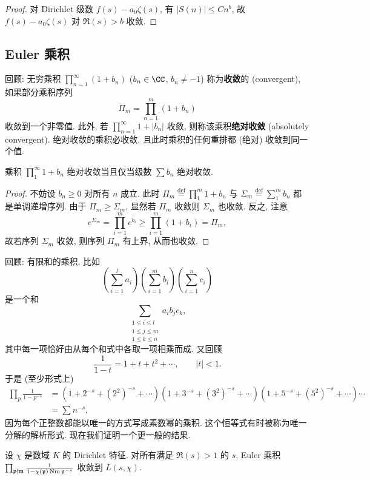 \begin{proof}
对 Dirichlet 级数 $f(s)-a_0\zeta(s)$, 有 $|S(n)|\le Cn^{b}$, 故 $f(s)-a_0\zeta(s)$ 对 $\Re(s)>b$ 收敛.
\end{proof}

\subsection*{Euler 乘积}

回顾: 无穷乘积 $\prod_{n=1}^{\infty}(1+b_n)$ ($b_n\in\CC$, $b_n\ne-1$) 称为\textbf{收敛}的 (convergent), 如果部分乘积序列
\[
\Pi_{m}=\prod_{n=1}^{m}(1+b_{n})
\]
收敛到一个非零值. 此外, 若 $\prod_{n=1}^{\infty}1+|b_{n}|$ 收敛, 则称该乘积\textbf{绝对收敛} (absolutely convergent). 绝对收敛的乘积必收敛, 且此时乘积的任何重排都 (绝对) 收敛到同一个值.

\begin{lemma}\label{lem:vi.2.6}
乘积 $\prod_{1}^{\infty}1+b_n$ 绝对收敛当且仅当级数 $\sum b_n$ 绝对收敛.
\end{lemma}

\begin{proof}
不妨设 $b_n\ge0$ 对所有 $n$ 成立. 此时 $\Pi_m\overset{\text{def}}{=}\prod_1^m 1+b_n$ 与 $\Sigma_m\overset{\text{def}}{=}\sum_1^m b_n$ 都是单调递增序列. 由于 $\Pi_m\ge\Sigma_m$, 显然若 $\Pi_m$ 收敛则 $\Sigma_m$ 也收敛. 反之, 注意
\[
e^{\Sigma_{m}}=\prod_{i=1}^{m}e^{b_{i}}\ge\prod_{i=1}^{m}(1+b_{i})=\Pi_{m},
\]
故若序列 $\Sigma_m$ 收敛, 则序列 $\Pi_m$ 有上界, 从而也收敛.
\end{proof}

回顾: 有限和的乘积, 比如
\[
\left(\sum_{i=1}^{l}a_{i}\right)\left(\sum_{i=1}^{m}b_{i}\right)\left(\sum_{i=1}^{n}c_{i}\right)
\]
是一个和
\[
\sum_{\substack{1\le i\le l\\1\le j\le m\\1\le k\le n}}a_{i}b_{j}c_{k},
\]
其中每一项恰好由从每个和式中各取一项相乘而成. 又回顾
\[
\frac{1}{1-t}=1+t+t^{2}+\cdots,\qquad|t|<1.
\]
于是 (至少形式上)
\begin{align*}
\prod_{p}\frac{1}{1-p^{-s}}&=(1+2^{-s}+(2^{2})^{-s}+\cdots)(1+3^{-s}+(3^{2})^{-s}+\cdots)(1+5^{-s}+(5^{2})^{-s}+\cdots)\cdots\\
&=\sum n^{-s},
\end{align*}
因为每个正整数都能以唯一的方式写成素数幂的乘积. 这个恒等式有时被称为唯一分解的解析形式. 现在我们证明一个更一般的结果.

\begin{proposition}\label{prop:vi.2.7}
设 $\chi$ 是数域 $K$ 的 Dirichlet 特征. 对所有满足 $\Re(s)>1$ 的 $s$, Euler 乘积 $\prod_{\mathfrak{p}\nmid\mathfrak{m}}\frac{1}{1-\chi(\mathfrak{p})\operatorname{Nm}\mathfrak{p}^{-s}}$ 收敛到 $L(s,\chi)$.
\end{proposition}

